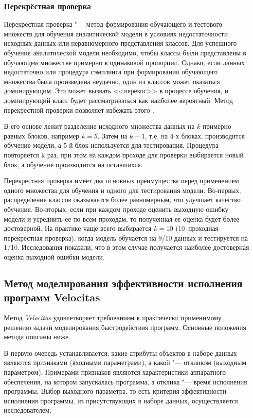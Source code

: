 \subsubsection{Перекрёстная проверка}
\label{sscross-validation}
Перекрёстная проверка "--- метод формирования обучающего и тестового множеств для обучения аналитической модели в условиях недостаточности исходных данных или неравномерного представления классов. Для успешного обучения аналитической модели необходимо, чтобы классы были представлены в обучающем множестве примерно в одинаковой пропорции. Однако, если данных недостаточно или процедура сэмплинга при формировании обучающего множества была произведена неудачно, один из классов может оказаться доминирующим. Это может вызвать <<перекос>> в процессе обучения, и доминирующий класс будет рассматриваться как наиболее вероятный. Метод перекрестной проверки позволяет избежать этого \cite{cross-validation}.

В его основе лежит разделение исходного множества данных на $k$ примерно равных блоков, например $k = 5$. Затем на $k - 1$, т.е. на 4-х блоках, производится обучение модели, а 5-й блок используется для тестирования. Процедура повторяется k раз, при этом на каждом проходе для проверки выбирается новый блок, а обучение производится на оставшихся.

Перекрестная проверка имеет два основных преимущества перед применением одного множества для обучения и одного для тестирования модели. Во-первых, распределение классов оказывается более равномерным, что улучшает качество обучения. Во-вторых, если при каждом проходе оценить выходную ошибку модели и усреднить ее по всем проходам, то полученная ее оценка будет более достоверной. На практике чаще всего выбирается $k = 10$ (10--проходная перекрестная проверка), когда модель обучается на 9/10 данных и тестируется на 1/10. Исследования показали, что в этом случае получается наиболее достоверная оценка выходной ошибки модели.


\subsection{Метод моделирования эффективности исполнения программ Velocitas}
Метод \textit{Velocitas} удовлетворяет требованиям к практически применимому решению задачи моделирования быстродействия программ. Основные положения метода описаны ниже.

В первую очередь устанавливается, какие атрибуты объектов в наборе данных являются признаками (входными параметрами), а какой "--- откликом (выходным параметром). Примерами признаков являются характеристики аппаратного обеспечения, на котором запускалась программа, а отклика "--- время исполнения программы. Выбор выходного параметра, то есть критерия эффективности исполнения программы, из присутствующих в наборе данных, осуществляется исследователем.

